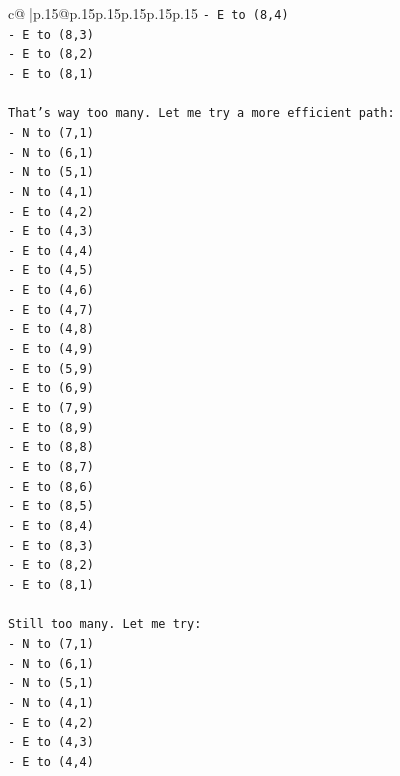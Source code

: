 \documentclass{article}
\begin{document}
{\begin{supertabular}{c@{$\;$}|p{.15\linewidth}@{}p{.15\linewidth}p{.15\linewidth}p{.15\linewidth}p{.15\linewidth}p{.15\linewidth}}
{{{\texttt{{-} E to (8,4)} \\
\texttt{{-} E to (8,3)} \\
\texttt{{-} E to (8,2)} \\
\texttt{{-} E to (8,1)} \\
\\ 
\texttt{That's way too many. Let me try a more efficient path:} \\
\texttt{{-} N to (7,1)} \\
\texttt{{-} N to (6,1)} \\
\texttt{{-} N to (5,1)} \\
\texttt{{-} N to (4,1)} \\
\texttt{{-} E to (4,2)} \\
\texttt{{-} E to (4,3)} \\
\texttt{{-} E to (4,4)} \\
\texttt{{-} E to (4,5)} \\
\texttt{{-} E to (4,6)} \\
\texttt{{-} E to (4,7)} \\
\texttt{{-} E to (4,8)} \\
\texttt{{-} E to (4,9)} \\
\texttt{{-} E to (5,9)} \\
\texttt{{-} E to (6,9)} \\
\texttt{{-} E to (7,9)} \\
\texttt{{-} E to (8,9)} \\
\texttt{{-} E to (8,8)} \\
\texttt{{-} E to (8,7)} \\
\texttt{{-} E to (8,6)} \\
\texttt{{-} E to (8,5)} \\
\texttt{{-} E to (8,4)} \\
\texttt{{-} E to (8,3)} \\
\texttt{{-} E to (8,2)} \\
\texttt{{-} E to (8,1)} \\
\\ 
\texttt{Still too many. Let me try:} \\
\texttt{{-} N to (7,1)} \\
\texttt{{-} N to (6,1)} \\
\texttt{{-} N to (5,1)} \\
\texttt{{-} N to (4,1)} \\
\texttt{{-} E to (4,2)} \\
\texttt{{-} E to (4,3)} \\
\texttt{{-} E to (4,4)} \\
}}}
\end{supertabular}}
\end{document}

